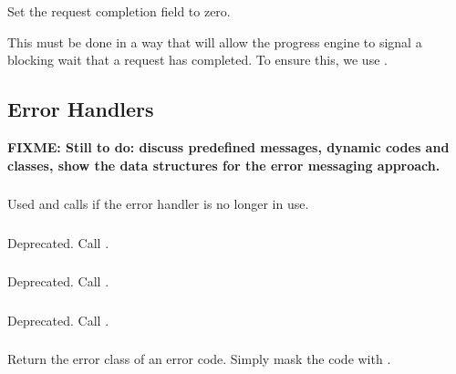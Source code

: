 \documentclass{article}
\def\fixme#1{\marginpar{FIXME:}\textbf{FIXME: #1}}
\begin{document}
\subsubsection{}
Set the request completion field  to zero.

This must be done in a way that will allow the progress engine to
signal a blocking wait that a request has completed.  To ensure this,
we use .  

\subsection{Error Handlers}
\label{sec:errhand}

\fixme{Still to do:
discuss predefined messages, dynamic codes and classes, show the data
structures for the error messaging approach.}
%

\subsubsection{}
Used  and calls
 if the error handler is no longer in use.

\subsubsection{}
Deprecated.  Call .

\subsubsection{}
Deprecated.  Call .

\subsubsection{}
Deprecated.  Call .

\subsubsection{}
Return the error class of an error code.  
Simply mask the code with .
\end{document}

